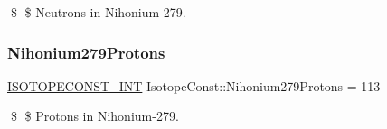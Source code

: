 \$ \$ Neutrons in Nihonium-\/279. \mbox{\label{group___isotope_const-_nihonium-_nh279_ga3cc58973a33cfbf1d7f0d574e70a56ba}} 
\subsubsection{\texorpdfstring{Nihonium279\+Protons}{Nihonium279Protons}}
{\footnotesize\ttfamily \mbox{\hyperlink{group___isotope_const-_macros_ga5f18360b3e99483a35c32d789e62621c}{I\+S\+O\+T\+O\+P\+E\+C\+O\+N\+S\+T\+\_\+\+I\+NT}} Isotope\+Const\+::\+Nihonium279\+Protons = 113}

\$ \$ Protons in Nihonium-\/279. 
